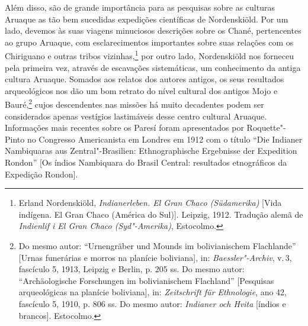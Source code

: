 Além disso, são de grande importância para as pesquisas sobre as
culturas Aruaque as tão bem sucedidas expedições científicas de
Nordenskiöld. Por um lado, devemos às suas viagens minuciosos
descrições sobre os Chané, pertencentes ao grupo Aruaque, com
esclarecimentos importantes sobre suas relações com os Chiriguano e
outras tribos vizinhas,\footnote{Erland Nordenskiöld,
  \emph{Indianerleben. El Gran Chaco (Südamerika)} {[}Vida indígena. El
  Gran Chaco (América do Sul){]}. Leipzig, 1912. Tradução alemã de
  \emph{Indienlif i El Gran Chaco (Syd"-Amerika)}, Estocolmo.} por outro
lado, Nordenskiöld nos forneceu pela primeira vez, através de escavações
sistemáticas, um conhecimento da antiga cultura Aruaque. Somados aos
relatos dos autores antigos, os seus resultados arqueológicos nos dão um
bom retrato do nível cultural dos antigos Mojo e Bauré,\footnote{Do mesmo
  autor: ``Urnengräber und Mounds im bolivianischem Flachlande''
  {[}Urnas funerárias e morros na planície boliviana{]}, in:
  \emph{Baessler"-Archiv}, v.\,3, fascículo 5, 1913, Leipzig e Berlin, p.
  205 ss. Do mesmo autor: ``Archäologische Forschungen im bolivianischem
  Flachland'' {[}Pesquisas arqueológicas na planície boliviana{]}, in:
  \emph{Zeitschrift für Ethnologie}, ano 42, fascículo 5, 1910, p. 806
  ss. Do mesmo autor: \emph{Indianer och Hvita} {[}índios e brancos{]}.
  Estocolmo.} cujos descendentes nas missões há muito decadentes podem
ser considerados apenas vestígios lastimáveis desse centro cultural
Aruaque. Informações mais recentes sobre os Paresí foram apresentados
por Roquette"-Pinto no Congresso Americanista em Londres em 1912 com o
título ``Die Indianer Nambiquaras aus Zentral"-Brasilien:
Ethnographische Ergebnisse der Expedition Rondon'' {[}Os índios
Nambiquara do Brasil Central: resultados etnográficos da Expedição
Rondon{]}.

